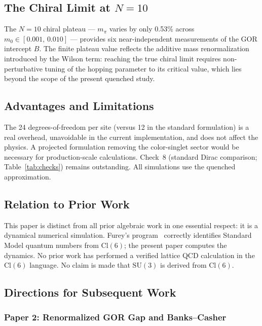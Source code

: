 \documentclass[12pt]{article}
\newcommand{\cl}{\mathrm{Cl}}          %
\newcommand{\su}{\mathrm{SU}}
\begin{document}
\subsection{The Chiral Limit at \texorpdfstring{$N=10$}{N=10}}
\label{sec:chiral-limit}

The $N=10$ chiral plateau --- $m_\pi$ varies by only 0.53\% across
$m_0\in[0.001,\,0.010]$ --- provides six near-independent measurements
of the GOR intercept $B$.  The finite plateau value reflects the
additive mass renormalization introduced by the Wilson term: reaching
the true chiral limit requires non-perturbative tuning of the hopping
parameter to its critical value, which lies beyond the scope of the
present quenched study.

\subsection{Advantages and Limitations}
\label{sec:limitations}

The 24 degrees-of-freedom per site (versus 12 in the standard
formulation) is a real overhead, unavoidable in the current
implementation, and does not affect the physics.  A projected
formulation removing the color-singlet sector would be necessary for
production-scale calculations.  Check~8 (standard Dirac comparison;
Table~\ref{tab:checks}) remains outstanding.  All simulations use the
quenched approximation.

\subsection{Relation to Prior Work}
\label{sec:prior-relation}

This paper is distinct from all prior algebraic work in one essential
respect: it is a dynamical numerical simulation.  Furey's
program~\cite{Furey2012,Furey2014,Furey2015,Furey2018a,Furey2018b}
correctly identifies Standard Model quantum numbers from $\cl(6)$; the
present paper computes the dynamics.  No prior work has performed a
verified lattice QCD calculation in the $\cl(6)$ language.  No claim is
made that $\su(3)$ is derived from $\cl(6)$.

\subsection{Directions for Subsequent Work}
\label{sec:future}

\subsubsection{Paper 2: Renormalized GOR Gap and Banks--Casher}
\label{sec:paper2}
\end{document}

